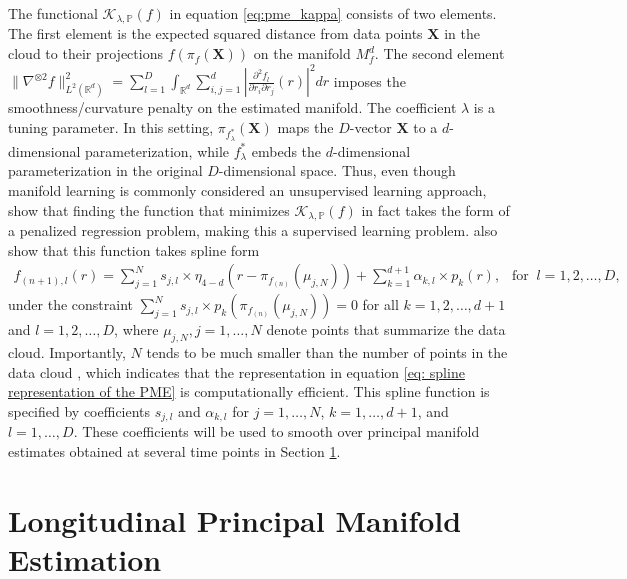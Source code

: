 \documentclass[12pt]{article}
\theoremstyle{definition}
\begin{document}
The functional $\mathcal{K}_{\lambda, \mathbb{P}}(f)$ in equation \eqref{eq:pme_kappa} consists of two elements. The first element is the expected squared distance from data points $\mathbf{X}$ in the cloud to their projections $f(\pi_f(\mathbf{X}))$ on the manifold $M_f^d$. The second element $\|\nabla^{\otimes 2}f\|_{L^2(\mathbb{R}^{d})}^2 = \sum_{l=1}^{D} \int_{\mathbb{R}^{d}}\sum_{i, j = 1}^{d}\left|\frac{\partial^2f_l}{\partial r_i \partial r_j}(r)\right|^2dr$ imposes the smoothness/curvature penalty on the estimated manifold. The coefficient $\lambda$ is a tuning parameter. In this setting,  $\pi_{f_{\lambda}^{*}}(\mathbf{X})$ maps the $D$-vector $\mathbf{X}$ to a $d$-dimensional parameterization, while $f_{\lambda}^{*}$ embeds the $d$-dimensional parameterization in the original $D$-dimensional space. Thus, even though manifold learning is commonly considered an unsupervised learning approach, \cite{meng2021Principal} show that finding the function that minimizes $\mathcal{K}_{\lambda, \mathbb{P}}(f)$ in fact takes the form of a penalized regression problem, making this a supervised learning problem. \cite{meng2021Principal} also show that this function takes spline form
\begin{align}\label{eq: spline representation of the PME}
    f_{(n+1), l}(r) = \sum_{j=1}^N s_{j, l} \times \eta_{4-d}\left(r - \pi_{f_{(n)}}(\mu_{j, N})\right) + \sum_{k=1}^{d + 1}\alpha_{k, l} \times p_k(r), \ \ \text{ for } \ l = 1, 2, \dots, D,
\end{align}
under the constraint $\sum_{j=1}^{N}s_{j, l} \times p_{k}\left(\pi_{f_{(n)}}(\mu_{j, N})\right) = 0$ for all $k = 1, 2, \dots, d + 1$ and $l = 1, 2, \dots, D$, where $\mu_{j, N}, j = 1, \dots, N$ denote points that summarize the data cloud. Importantly, $N$ tends to be much smaller than the number of points in the data cloud \citep[fig. 3]{meng2021Principal}, which indicates that the representation in equation \eqref{eq: spline representation of the PME} is computationally efficient. This spline function is specified by coefficients $s_{j, l}$ and $\alpha_{k, l}$ for $j = 1, \dots, N$, $k = 1, \dots, d+1$, and $l = 1, \dots, D$. These coefficients will be used to smooth over principal manifold estimates obtained at several time points in Section \ref{s:LPME}.






\section{Longitudinal Principal Manifold Estimation}\label{s:LPME}
\end{document}
